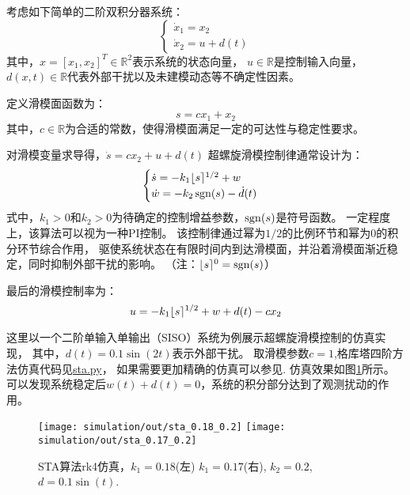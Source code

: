 考虑如下简单的二阶双积分器系统：
\begin{equation}
	\begin{cases}
		\dot{x}_{1} = x_{2} \\
		\dot{x}_{2} = u + d(t)
	\end{cases}
\end{equation}
其中，$x=[x_1,x_2]^T \in \mathbb{R}^{2}$表示系统的状态向量，
$u\in \mathbb{R}$是控制输入向量，
$d(x,t)\in \mathbb{R}$代表外部干扰以及未建模动态等不确定性因素。

定义滑模面函数为：
\begin{equation}
	s=c x_1+x_2
\end{equation}
其中，$c \in \mathbb{R}$为合适的常数，使得滑模面满足一定的可达性与稳定性要求。

对滑模变量求导得，$\dot{s}=c x_2+ u+d(t)$
超螺旋滑模控制律通常设计为：
\begin{equation}\label{eq sta s}
	\begin{cases}
		\dot{s}=-k_1  \lfloor s \rceil^{1/2}+w\\
		\dot{w}=-k_2 \mathop{\mathrm{sgn}} (s)-\dot{d}(t)
	\end{cases}
\end{equation}
式中，$k_1 > 0$和$k_2 > 0$为待确定的控制增益参数，$\mathop{\mathrm{sgn}} (s)$是符号函数。
一定程度上，该算法可以视为一种PI控制。
该控制律通过幂为$1/2$的比例环节和幂为$0$的积分环节综合作用，
驱使系统状态在有限时间内到达滑模面，并沿着滑模面渐近稳定，同时抑制外部干扰的影响。
（注：$\lfloor s \rceil^0=\mathop{\mathrm{sgn}} (s)$）


最后的滑模控制率为：
\begin{equation}
	u = -k_1 \lfloor s \rceil^{1/2} + w + d(t) -c x_2
\end{equation}

这里以一个二阶单输入单输出（SISO）系统为例展示超螺旋滑模控制的仿真实现，
其中，$d(t) = 0.1\sin(2t)$表示外部干扰。
取滑模参数$c=1$,格库塔四阶方法仿真代码见\href{https://github.com/xsro/xsro.github.io/blob/zola/typst/sliding-mode-control/simulation/sta.py}{sta.py}，
如果需要更加精确的仿真可以参见\cite{livneProperDiscretizationHomogeneous2014}.
仿真效果如图\ref{fig basic sta}所示。
可以发现系统稳定后$w(t)+d(t)=0$，系统的积分部分达到了观测扰动的作用。
\begin{figure}
	\centering
	\texttt{[image: simulation/out/sta\_0.18\_0.2]}
	\texttt{[image: simulation/out/sta\_0.17\_0.2]}
	\caption{STA算法rk4仿真，$k_1=0.18$(左) $k_1=0.17$(右),
		 $k_2=0.2$, $d=0.1 \sin(t)$.}
	\label{fig basic sta}
\end{figure}
